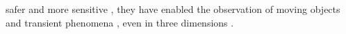 safer
\cite{article:BercoffITUFFC2004} and
more sensitive
\cite{article:BercoffITUFFC2011},
they have enabled
the observation of
moving objects and
transient phenomena
\cite{article:PapadacciITUFFC2014,article:MaceITUFFC2013,article:BercoffITUFFC2004}, even in
three dimensions
\cite{article:ProvostPMB2014}.

